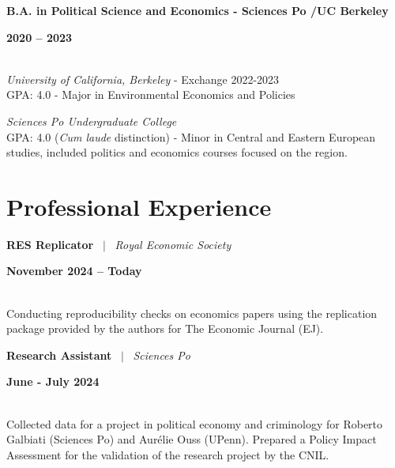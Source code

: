 \documentclass[a4paper,11pt]{article}
\begin{document}
\noindent
\begin{minipage}[t]{0.7\textwidth}
  \textbf{B.A. in Political Science and Economics - Sciences Po /UC Berkeley}
\end{minipage}%
\begin{minipage}[t]{0.3\textwidth}
  \raggedleft \textbf{2020 -- 2023}
\end{minipage}
\\
\textit{University of California, Berkeley} - Exchange 2022-2023 \\
GPA: 4.0  - Major in Environmental Economics and Policies

\textit{Sciences Po Undergraduate College}\\
GPA: 4.0 (\textit{Cum laude} distinction) - Minor in Central and Eastern European studies, included politics and economics courses focused on the region. 




\section{Professional Experience}

\noindent
\newline
\begin{minipage}[t]{0.7\textwidth}
  \textbf{RES Replicator} \ $|$ \ \textit{Royal Economic Society}
\end{minipage}%
\begin{minipage}[t]{0.3\textwidth}
  \raggedleft \textbf{November 2024 -- Today}
\end{minipage}
\\
Conducting reproducibility checks on economics papers using the replication package provided by the authors for The Economic Journal (EJ).

\noindent
\begin{minipage}[t]{0.7\textwidth}
  \textbf{Research Assistant} \ $|$ \ \textit{Sciences Po}
\end{minipage}%
\begin{minipage}[t]{0.3\textwidth}
  \raggedleft \textbf{June - July 2024}
\end{minipage}
\\
Collected data for a project in political economy and criminology for Roberto Galbiati (Sciences Po) and Aurélie Ouss (UPenn). Prepared a Policy Impact Assessment for the validation of the research project by the CNIL.
\end{document}
